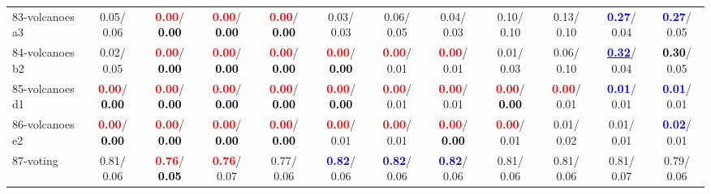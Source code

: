 \begin{table}[h]
\begin{center}
{\begin{tabular}{lc|c|c|c|c|c|c|c|c|c|c}
83-volcanoes a3 &   0.05/  0.06 & \textcolor{red}{\textbf{  0.00}}/\textcolor{black}{\textbf{  0.00}} & \textcolor{red}{\textbf{  0.00}}/\textcolor{black}{\textbf{  0.00}} & \textcolor{red}{\textbf{  0.00}}/\textcolor{black}{\textbf{  0.00}} &   0.03/  0.03 &   0.06/  0.05 &   0.04/  0.03 &   0.10/  0.10 &   0.13/  0.10 & \textcolor{blue}{\textbf{  0.27}}/  0.04 & \textcolor{blue}{\textbf{  0.27}}/  0.05 \\
84-volcanoes b2 &   0.02/  0.05 & \textcolor{red}{\textbf{  0.00}}/\textcolor{black}{\textbf{  0.00}} & \textcolor{red}{\textbf{  0.00}}/\textcolor{black}{\textbf{  0.00}} & \textcolor{red}{\textbf{  0.00}}/\textcolor{black}{\textbf{  0.00}} & \textcolor{red}{\textbf{  0.00}}/\textcolor{black}{\textbf{  0.00}} & \textcolor{red}{\textbf{  0.00}}/  0.01 & \textcolor{red}{\textbf{  0.00}}/  0.01 &   0.01/  0.03 &   0.06/  0.10 & \underline{\textcolor{blue}{\textbf{  0.32}}}/  0.04 & \textcolor{black}{\textbf{  0.30}}/  0.05 \\
85-volcanoes d1 & \textcolor{red}{\textbf{  0.00}}/\textcolor{black}{\textbf{  0.00}} & \textcolor{red}{\textbf{  0.00}}/\textcolor{black}{\textbf{  0.00}} & \textcolor{red}{\textbf{  0.00}}/\textcolor{black}{\textbf{  0.00}} & \textcolor{red}{\textbf{  0.00}}/\textcolor{black}{\textbf{  0.00}} & \textcolor{red}{\textbf{  0.00}}/\textcolor{black}{\textbf{  0.00}} & \textcolor{red}{\textbf{  0.00}}/  0.01 & \textcolor{red}{\textbf{  0.00}}/  0.01 & \textcolor{red}{\textbf{  0.00}}/\textcolor{black}{\textbf{  0.00}} & \textcolor{red}{\textbf{  0.00}}/  0.01 & \textcolor{blue}{\textbf{  0.01}}/  0.01 & \textcolor{blue}{\textbf{  0.01}}/  0.01 \\ \hline
86-volcanoes e2 & \textcolor{red}{\textbf{  0.00}}/\textcolor{black}{\textbf{  0.00}} & \textcolor{red}{\textbf{  0.00}}/\textcolor{black}{\textbf{  0.00}} & \textcolor{red}{\textbf{  0.00}}/\textcolor{black}{\textbf{  0.00}} & \textcolor{red}{\textbf{  0.00}}/\textcolor{black}{\textbf{  0.00}} & \textcolor{red}{\textbf{  0.00}}/  0.01 & \textcolor{red}{\textbf{  0.00}}/  0.01 & \textcolor{red}{\textbf{  0.00}}/\textcolor{black}{\textbf{  0.00}} & \textcolor{red}{\textbf{  0.00}}/  0.01 &   0.01/  0.02 &   0.01/  0.01 & \textcolor{blue}{\textbf{  0.02}}/  0.01 \\
87-voting &   0.81/  0.06 & \textcolor{red}{\textbf{  0.76}}/\textcolor{black}{\textbf{  0.05}} & \textcolor{red}{\textbf{  0.76}}/  0.07 &   0.77/  0.06 & \textcolor{blue}{\textbf{  0.82}}/  0.06 & \textcolor{blue}{\textbf{  0.82}}/  0.06 & \textcolor{blue}{\textbf{  0.82}}/  0.06 &   0.81/  0.06 &   0.81/  0.06 &   0.81/  0.07 &   0.79/  0.06 \\

\end{tabular}}
\end{center}
\end{table}

